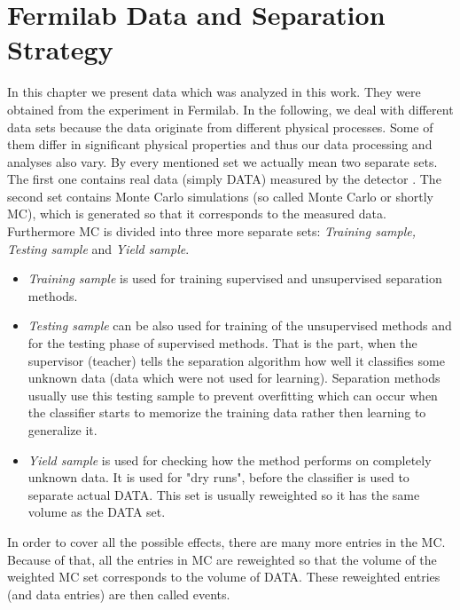 \chapter{Fermilab Data and Separation Strategy}\label{ch:FNAL_data}

In this chapter we present data which was analyzed in this work. They were obtained from the experiment \dzero in Fermilab. In the following, we deal with different data sets because the data originate from different physical processes. Some of them differ in significant physical properties and thus our data processing and analyses also vary. By every mentioned set we actually mean two separate sets. The first one contains real data (simply DATA) measured by the detector \dzero. The second set contains Monte Carlo simulations (so called Monte Carlo or shortly MC), which is generated so that it corresponds to the measured data. Furthermore MC is divided into three more separate sets: {\em Training sample, Testing sample} and {\em Yield sample}. 

\begin{itemize}
\item {\em Training sample} is used for training supervised and unsupervised separation methods. 
%
\item {\em Testing sample} can be also used for training of the unsupervised methods and for the testing phase of supervised methods. That is the part, when the supervisor (teacher) tells the separation algorithm how well it classifies some unknown data (data which were not used for learning). Separation methods usually use this testing sample to prevent overfitting which can occur when the classifier starts to memorize the training data rather then learning to generalize it.
%
\item {\em Yield sample} is used for checking how the method performs on completely unknown data. It is used for "dry runs", before the classifier is used to separate actual DATA. This set is usually reweighted so it has the same volume as the DATA set.
\end{itemize}

In order to cover all the possible effects, there are many more entries in the MC. Because of that, all the entries in MC are reweighted so that the volume of the weighted MC set corresponds to the volume of DATA. These reweighted entries (and data entries) are then called events.


